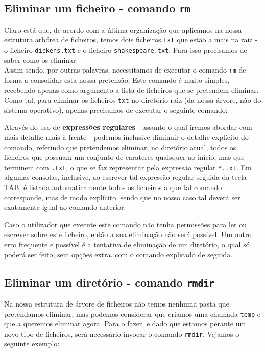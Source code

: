 \documentclass[a4paper, onecolumn, 10pt]{report}
\begin{document}
\subsection{Eliminar um ficheiro - comando \texttt{rm}}

Claro está que, de acordo com a última organização que aplicámos na nossa estrutura arbórea de ficheiros, temos dois ficheiros \texttt{txt} que estão a mais na raiz - o ficheiro \texttt{dickens.txt} e o ficheiro \texttt{shakespeare.txt}. Para isso precisamos de saber como os eliminar. \\
Assim sendo, por outras palavras, necessitamos de executar o comando \texttt{rm} de forma a consolidar esta nossa pretensão. Este comando é muito simples, recebendo apenas como argumento a lista de ficheiros que se pretendem eliminar. Como tal, para eliminar os ficheiros \texttt{txt} no diretório raiz (da nossa árvore, não do sistema operativo), apenas precisamos de executar o seguinte comando:



Através do uso de \textbf{expressões regulares} - assunto o qual iremos abordar com mais detalhe mais à frente - podemos inclusive diminuir o detalhe explícito do comando, referindo que pretendemos eliminar, no diretório atual, todos os ficheiros que possuam um conjunto de carateres quaisquer ao início, mas que terminem com \texttt{.txt}, o que se faz representar pela expressão regular \texttt{*.txt}. Em algumas consolas, inclusive, ao escrever tal expressão regular seguida da tecla TAB, é listada automaticamente todos os ficheiros a que tal comando corresponde, mas de modo explícito, sendo que no nosso caso tal deverá ser exatamente igual ao comando anterior.



Caso o utilizador que execute este comando não tenha permissões para ler ou escrever sobre este ficheiro, então a sua eliminação não será possível. Um outro erro frequente e possível é a tentativa de eliminação de um diretório, o qual só poderá ser feito, sem opções extra, com o comando explicado de seguida.

\subsection{Eliminar um diretório - comando \texttt{rmdir}}

Na nossa estrutura de árvore de ficheiros não temos nenhuma pasta que pretendamos eliminar, mas podemos considerar que criamos uma chamada \texttt{temp} e que a queremos eliminar agora. Para o fazer, e dado que estamos perante um novo tipo de ficheiros, será necessário invocar o comando \texttt{rmdir}. Vejamos o seguinte exemplo:
\end{document}
